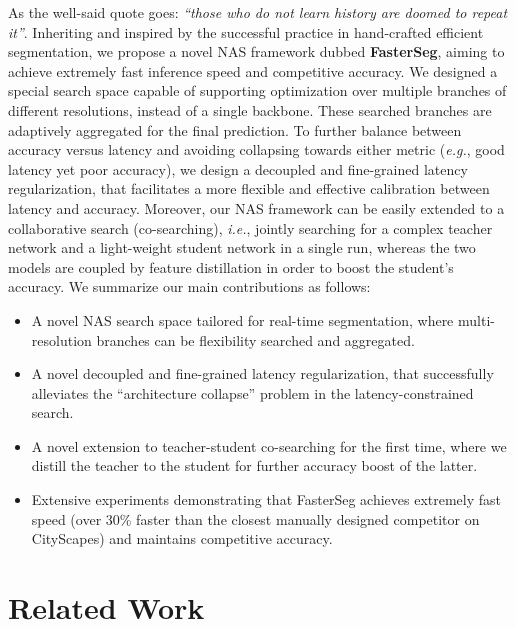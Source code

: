 \documentclass{article} \usepackage{iclr2020_conference,times}
\begin{document}
As the well-said quote goes: \textit{``those who do not learn history are doomed to repeat it''}. Inheriting and inspired by the successful practice in hand-crafted efficient segmentation, we propose a novel NAS framework dubbed \textbf{FasterSeg}, aiming to achieve extremely fast inference speed and competitive accuracy. We designed a special search space capable of supporting optimization over multiple branches of different resolutions, instead of a single backbone. These searched branches are adaptively aggregated for the final prediction. To further balance between accuracy versus latency and avoiding collapsing towards either metric (\textit{e.g.}, good latency yet poor accuracy), we design a decoupled and fine-grained latency regularization, that facilitates a more flexible and effective calibration between latency and accuracy. Moreover, our NAS framework can be easily extended to a collaborative search (co-searching), \textit{i.e.}, jointly searching for a complex teacher network and a light-weight student network in a single run, whereas the two models are coupled by feature distillation in order to boost the student's accuracy. We summarize our main contributions as follows:
\begin{itemize}
\vspace{-0.7em}
    \item A novel NAS search space tailored for real-time segmentation, where multi-resolution branches
can be flexibility searched and aggregated.
    \vspace{-0.3em}
    \item A novel decoupled and fine-grained latency regularization, that successfully alleviates the ``architecture collapse'' problem in the latency-constrained search.
    \vspace{-0.3em}
    \item A novel extension to teacher-student co-searching for the first time, where we distill the teacher to the student for further accuracy boost of the latter.
    \vspace{-0.3em}
    \item Extensive experiments demonstrating that FasterSeg achieves extremely fast speed (over 30\% faster than the closest manually designed competitor on CityScapes) and maintains competitive accuracy.
    \vspace{-0.8em}
\end{itemize}\vspace{-0.5em}


\section{Related Work}\vspace{-0.7em}
\end{document}
